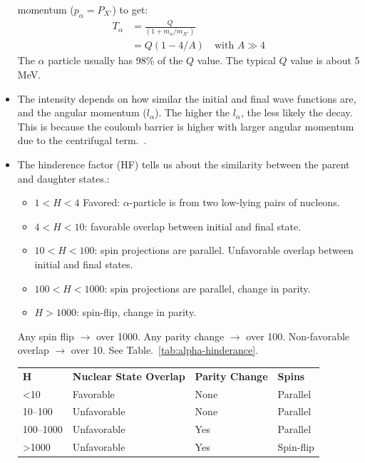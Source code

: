 \documentclass[letter]{article}
\begin{document}
\begin{itemize}
momentum ($p_{\alpha}=P_{X'}$) to get:
\begin{equation*}
  \begin{split}
    T_{\alpha}&=\frac{Q}{(1+m_{\alpha}/m_{X'})} \\[10pt]
    &=Q(1-4/A) \quad \text{with } A \gg 4
  \end{split}
\end{equation*}
The $\alpha$ particle usually has 98\% of the $Q$ value. The typical
$Q$ value is about 5 MeV.~\cite[pp. 248]{krane}
\item The intensity depends on how similar the initial and final wave
  functions are, and the angular momentum ($l_{\alpha}$). The higher
  the $l_{\alpha}$, the less likely the decay. This is because the
  coulomb barrier is higher with larger angular momentum due to the
  centrifugal term.~\cite[pp. 257-258]{krane}.
\item The hinderence factor (HF) tells us about the similarity between
  the parent and daughter states.:
  \begin{itemize}
  \item $1<H<4$ Favored: $\alpha$-particle is from two low-lying pairs
    of nucleons.
  \item $4<H<10$: favorable overlap between initial and final state.
  \item $10<H<100$: spin projections are parallel. Unfavorable overlap
    between initial and final states.
  \item $100<H<1000$: spin projections are parallel, change in parity.
  \item $H>1000$: spin-flip, change in parity.
  \end{itemize}
Any spin flip $\to$ over 1000. Any parity change $\to$ over
100. Non-favorable overlap $\to$ over 10. See
Table.~\ref{tab:alpha-hinderance}.~\cite[Lec. 18]{lecture}
\begin{table}[hbt]
\centering
\begin{tabular}{llll}
\textbf{H}       & \textbf{Nuclear State Overlap} & \textbf{Parity Change} & \textbf{Spins} \\
\textless10   & Favorable                      & None                   & Parallel       \\
10--100           & Unfavorable                    & None                   & Parallel       \\
100--1000         & Unfavorable                    & Yes                    & Parallel       \\
\textgreater1000 & Unfavorable                    & Yes                    & Spin-flip      \\

\end{tabular}
\end{table}
\end{itemize}
\end{document}
